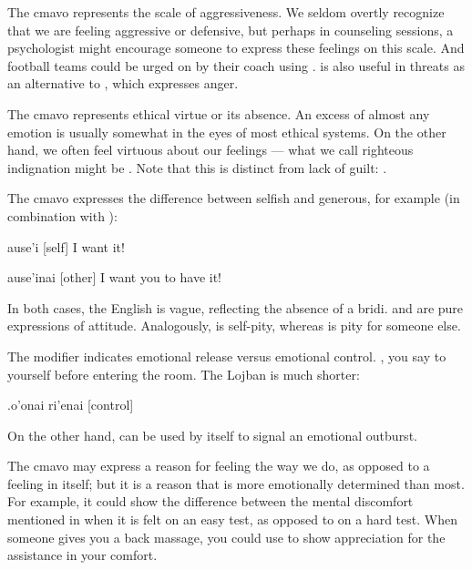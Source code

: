 The cmavo  represents the scale of aggressiveness.
    We seldom overtly recognize that we are feeling aggressive or
    defensive, but perhaps in counseling sessions, a psychologist
    might encourage someone to express these feelings on this
    scale. And football teams could be urged on by their coach
    using .  is also useful in threats as an
    alternative to , which expresses anger.

The cmavo  represents ethical virtue or its absence.
    An excess of almost any emotion is usually somewhat 
    in the eyes of most ethical systems. On the other hand, we
    often feel virtuous about our feelings --- what we call
    righteous indignation might be . Note that this
    is distinct from lack of guilt: .

The cmavo  expresses the difference between selfish
    and generous, for example (in combination with ):
\begin{example}
ause'i\n
{} [self]\n
I want it!
\end{example}

\begin{example}
ause'inai\n
{} [other]\n
I want you to have it!
\end{example}

In both cases, the English  is vague, reflecting the
    absence of a bridi.  and  are pure expressions of attitude.
    Analogously,  is self-pity, whereas 
    is pity for someone else.

The modifier  indicates emotional release versus
    emotional control. ,
    you say to yourself before entering the room. The Lojban is
    much shorter:
\begin{example}
.o'onai ri'enai\n
{} [control]
\end{example}

On the other hand,  can be used by itself to signal
    an emotional outburst.

The cmavo  may express a reason for feeling the way
    we do, as opposed to a feeling in itself; but it is a reason
    that is more emotionally determined than most. For example, it
    could show the difference between the mental discomfort
    mentioned in  when it is felt on an
    easy test, as opposed to on a hard test. When someone gives you
    a back massage, you could use  to show appreciation
    for the assistance in your comfort.

